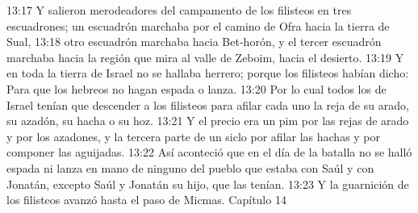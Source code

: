 13:17 Y salieron merodeadores del campamento de los filisteos en tres escuadrones; un escuadrón marchaba por el camino de Ofra hacia la tierra de Sual,  
13:18 otro escuadrón marchaba hacia Bet-horón, y el tercer escuadrón marchaba hacia la región que mira al valle de Zeboim, hacia el desierto.  
13:19 Y en toda la tierra de Israel no se hallaba herrero; porque los filisteos habían dicho: Para que los hebreos no hagan espada o lanza.  
13:20 Por lo cual todos los de Israel tenían que descender a los filisteos para afilar cada uno la reja de su arado, su azadón, su hacha o su hoz.  
13:21 Y el precio era un pim por las rejas de arado y por los azadones, y la tercera parte de un siclo   por afilar las hachas y por componer las aguijadas.  
13:22 Así aconteció que en el día de la batalla no se halló espada ni lanza en mano de ninguno del pueblo que estaba con Saúl y con Jonatán, excepto Saúl y Jonatán su hijo, que las tenían.  
13:23 Y la guarnición de los filisteos avanzó hasta el paso de Micmas.  
Capítulo 14 

